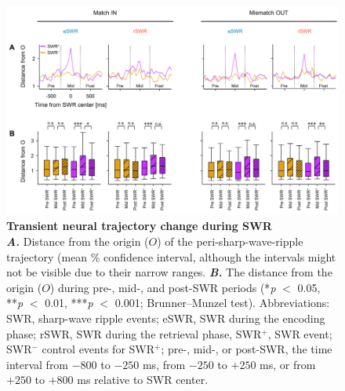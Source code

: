 \documentclass[final,3p,times,twocolumn]{elsarticle}
\begin{document}
        \clearpage
        \begin{figure}[ht]
        	\centering
            \includegraphics[width=1\textwidth]{./src/figures/.png/Figure_ID_05.png}
        	\caption{\textbf{
Transient neural trajectory change during SWR
}
\smallskip
\\
\textbf{\textit{A.}} Distance from the origin ($O$) of the peri-sharp-wave-ripple trajectory (mean \% confidence interval, although the intervals might not be visible due to their narrow ranges. \textbf{\textit{B.}}  The distance from the origin ($O$) during pre-, mid-, and post-SWR periods (*\textit{p} $<$ 0.05, **\textit{p} $<$ 0.01, ***\textit{p} $<$ 0.001; Brunner--Munzel test). Abbreviations: SWR, sharp-wave ripple events; eSWR, SWR during the encoding phase; rSWR, SWR during the retrieval phase, SWR$^+$, SWR event; SWR$^-$ control events for SWR$^+$; pre-, mid-, or post-SWR, the time interval from $-800$ to $-250$ ms, from $-250$ to $+250$ ms, or from $+250$ to $+800$ ms relative to SWR center.
}
        	\label{fig:05}
        \end{figure}
        \clearpage
\end{document}
